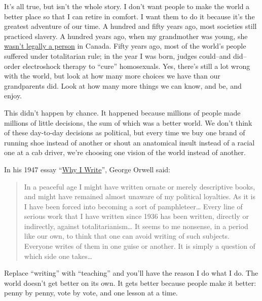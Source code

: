 \documentclass[10pt,statementpaper]{memoir}
\begin{document}
It's all true, but isn't the whole story. I don't want people to make
the world a better place so that I can retire in comfort. I want them to
do it because it's the greatest adventure of our time. A hundred and
fifty years ago, most societies still practiced slavery. A hundred years
ago, when my grandmother was young, she
\href{http://www.canuck.com/famous5/html/history.html}{wasn't legally a
person} in Canada. Fifty years ago, most of the world's people suffered
under totalitarian rule; in the year I was born, judges could--and
did--order electroshock therapy to ``cure'' homosexuals. Yes, there's
still a lot wrong with the world, but look at how many more choices we
have than our grandparents did. Look at how many more things we can
know, and be, and enjoy.

This didn't happen by chance. It happened because millions of people
made millions of little decisions, the sum of which was a better world.
We don't think of these day-to-day decisions as political, but every
time we buy one brand of running shoe instead of another or shout an
anatomical insult instead of a racial one at a cab driver, we're
choosing one vision of the world instead of another.

In his 1947 essay
``\href{http://www.resort.com/~prime8/Orwell/whywrite.html}{Why I
Write}'', George Orwell said:

\begin{quote}
In a peaceful age I might have written ornate or merely descriptive
books, and might have remained almost unaware of my political loyalties.
As it is I have been forced into becoming a sort of pamphleteer\ldots{}
Every line of serious work that I have written since 1936 has been
written, directly or indirectly, against totalitarianism\ldots{} It
seems to me nonsense, in a period like our own, to think that one can
avoid writing of such subjects. Everyone writes of them in one guise or
another. It is simply a question of which side one takes\ldots{}
\end{quote}

Replace ``writing'' with ``teaching'' and you'll have the reason I do
what I do. The world doesn't get better on its own. It gets better
because people make it better: penny by penny, vote by vote, and one
lesson at a time.
\end{document}
